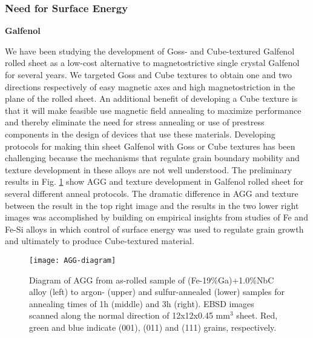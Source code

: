 
\subsubsection{Need for Surface Energy}

\textbf{Galfenol} 

We have been studying the development of Goss- and Cube-textured Galfenol rolled sheet as a low-cost alternative to magnetostrictive single crystal Galfenol for several years. We targeted Goss and Cube textures to obtain one and two directions respectively of easy magnetic axes and high magnetostriction in the plane of the rolled sheet. An additional benefit of developing a Cube texture is that it will make feasible use magnetic field annealing to maximize performance\cite{Yoo2008,Yoo2009} and thereby eliminate the need for stress annealing or use of prestress components in the design of devices that use these materials.\cite{Restorff2006,Summers2009b} Developing protocols for making thin sheet Galfenol with Goss or Cube textures has been challenging because the mechanisms that regulate grain boundary mobility and texture development in these alloys are not well understood. The preliminary results in Fig. \ref{fig:AGG-diagram} show AGG and texture development in Galfenol rolled sheet for several different anneal protocols. The dramatic difference in AGG and texture between the result in the top right image and the results in the two lower right images was accomplished by building on empirical insights from studies of Fe and Fe-Si alloys in which control of surface energy was used to regulate grain growth and ultimately to produce Cube-textured material.\cite{Walter1965,dunn1962surface,waeckerle1993effect,Kramer1992}

\begin{figure}[h!] 
	\centering
	\texttt{[image: AGG-diagram]}
	\caption{Diagram of AGG from as-rolled sample of (Fe-19$\%$Ga)+1.0$\%$NbC alloy (left) to argon- (upper) and sulfur-annealed (lower) samples for annealing times of 1h (middle) and 3h (right). EBSD images scanned along the normal direction of 12x12x0.45 mm$^{3}$ sheet. Red, green and blue indicate \hkl(001), \hkl(011) and \hkl(111) grains, respectively. 
	}
	\label{fig:AGG-diagram}		
\end{figure}


